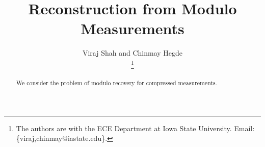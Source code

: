\documentclass[10pt,journal]{IEEEtran}
\begin{document}
\title{Reconstruction from Modulo Measurements}

\author{
	Viraj Shah and Chinmay Hegde \\
	\thanks{The authors are with the ECE Department at Iowa State University. Email: \{viraj,chinmay@iastate.edu\}.  %
	}
}


\maketitle

\begin{abstract}
	We consider the problem of modulo recovery for compressed measurements.
\end{abstract}







%
%
%


%
%
\end{document}
